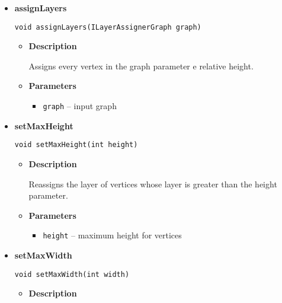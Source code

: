 {{{{{{{{{{\begin{itemize}
{\begin{itemize}
{Defines a set of constraints which should be considered by the algorithm.
}
\item{
{\bf  Parameters}
  \begin{itemize}
   \item{
\texttt{constraints} -- relative layer constraints the algorithm should consider}
  \end{itemize}
}%
\end{itemize}
}%
\item{ 
{\bf  assignLayers}\\
\begin{lstlisting}[frame=none]
void assignLayers(ILayerAssignerGraph graph)\end{lstlisting} %
\begin{itemize}
\item{
{\bf  Description}

Assigns every vertex in the graph parameter e relative height.
}
\item{
{\bf  Parameters}
  \begin{itemize}
   \item{
\texttt{graph} -- input graph}
  \end{itemize}
}%
\end{itemize}
}%
\item{ 
{\bf  setMaxHeight}\\
\begin{lstlisting}[frame=none]
void setMaxHeight(int height)\end{lstlisting} %
\begin{itemize}
\item{
{\bf  Description}

Reassigns the layer of vertices whose layer is greater than the height parameter.
}
\item{
{\bf  Parameters}
  \begin{itemize}
   \item{
\texttt{height} -- maximum height for vertices}
  \end{itemize}
}%
\end{itemize}
}%
\item{ 
{\bf  setMaxWidth}\\
\begin{lstlisting}[frame=none]
void setMaxWidth(int width)\end{lstlisting} %
\begin{itemize}
\item{
{\bf  Description}

}
\end{itemize}}
\end{itemize}}}}}}}}}}}
